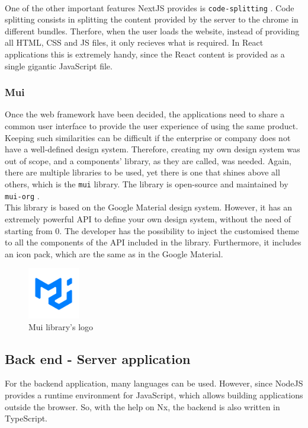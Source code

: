 \documentclass[a4paper, 12pt, oneside]{book}
\begin{document}
\\[8pt]
One of the other important features NextJS provides is \texttt{code-splitting} \cite{code-splitting}. Code splitting consists in splitting the content provided by the server to the chrome in different bundles. Therfore, when the user loads the website, instead of providing all HTML, CSS and JS files, it only recieves what is required. In React applications this is extremely handy, since the React content is provided as a single gigantic JavaScript file. 
\subsubsection{Mui}
Once the web framework have been decided, the applications need to share a common user interface to provide the user experience of using the same product. Keeping such similarities can be difficult if the enterprise or company does not have a well-defined design system. Therefore, creating my own design system was out of scope, and a components' library, as they are called, was needed. Again, there are multiple libraries to be used, yet there is one that shines above all others, which is the \texttt{mui} library. The library is open-source and maintained by \texttt{mui-org} \cite{mui}.
\\[8pt]
This library is based on the Google Material design system. However, it has an extremely powerful API to define your own design system, without the need of starting from 0. The developer has the possibility to inject the customised theme to all the components of the API included in the library. Furthermore, it includes an icon pack, which are the same as in the Google Material.
\begin{figure}[H]
	\centering
	\includegraphics[width=0.2\textwidth]{assets/mui-logo.png}
	\caption{Mui library's logo}
\end{figure}
\subsection{Back end - Server application}
For the backend application, many languages can be used. However, since NodeJS provides a runtime environment for JavaScript, which allows building applications outside the browser. So, with the help on Nx, the backend is also written in TypeScript.
\end{document}
